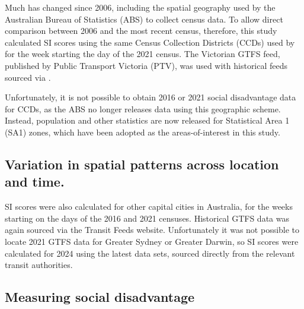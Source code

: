 \documentclass[preprint, 3p,
authoryear]{elsarticle} %
\begin{document}
Much has changed since 2006, including the spatial geography used by the
Australian Bureau of Statistics (ABS) to collect census data. To allow
direct comparison between 2006 and the most recent census, therefore,
this study calculated SI scores using the same Census Collection
Districts (CCDs) used by \citet{currie2010identifying} for the week
starting the day of the 2021 census. The Victorian GTFS feed, published
by Public Transport Victoria (PTV), was used with historical feeds
sourced via \citet{transitfeeds_victoria:2023aa}.

Unfortunately, it is not possible to obtain 2016 or 2021 social
disadvantage data for CCDs, as the ABS no longer releases data using
this geographic scheme. Instead, population and other statistics are now
released for Statistical Area 1 (SA1) zones, which have been adopted as
the areas-of-interest in this study.

\subsection{Variation in spatial patterns across location and
time.}\label{variation-in-spatial-patterns-across-location-and-time.}

SI scores were also calculated for other capital cities in Australia,
for the weeks starting on the days of the 2016 and 2021 censuses.
Historical GTFS data was again sourced via the Transit Feeds website.
Unfortunately it was not possible to locate 2021 GTFS data for Greater
Sydney or Greater Darwin, so SI scores were calculated for 2024 using
the latest data sets, sourced directly from the relevant transit
authorities.

\subsection{Measuring social
disadvantage}\label{measuring-social-disadvantage}
\end{document}
